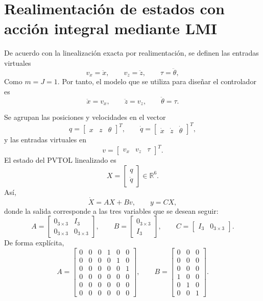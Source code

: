 \clearpage

\section{Realimentación de estados con acción integral mediante LMI}

De acuerdo con la linealización exacta por realimentación, se definen las
entradas virtuales
\[
  v_x=\ddot{x},\qquad v_z=\ddot{z},\qquad \tau=\ddot{\theta},
\]
Como $m=J=1$. Por tanto, el modelo que se
utiliza para diseñar el controlador es
\[
  \ddot{x}=v_x,\qquad
  \ddot{z}=v_z,\qquad
  \ddot{\theta}=\tau.
\]

Se agrupan las posiciones y velocidades en el vector
\[
  q=
  \begin{bmatrix}x&z&\theta\end{bmatrix}^{T},
  \qquad
  \dot q=
  \begin{bmatrix}\dot{x}&\dot{z}&\dot{\theta}\end{bmatrix}^{T},
\]
y las entradas virtuales en
\[
  v=
  \begin{bmatrix}v_x&v_z&\tau\end{bmatrix}^{T}.
\]
El estado del PVTOL linealizado es
\[
  X=
  \begin{bmatrix}q\\\dot q\end{bmatrix}\in\mathbb{R}^{6}.
\]
Así,
\[
  \dot X=AX+Bv,\qquad y=CX,
\]
donde la salida corresponde a las tres variables que se desean seguir:
\[
  A=
  \begin{bmatrix}
    0_{3\times3}&I_3\\
    0_{3\times3}&0_{3\times3}
  \end{bmatrix},
  \qquad
  B=
  \begin{bmatrix}
    0_{3\times3}\\
    I_3
  \end{bmatrix},
  \qquad
  C=
  \begin{bmatrix}I_3&0_{3\times3}\end{bmatrix}.
\]
De forma explícita,
\[
  A=
  \begin{bmatrix}
  0&0&0&1&0&0\\
  0&0&0&0&1&0\\
  0&0&0&0&0&1\\
  0&0&0&0&0&0\\
  0&0&0&0&0&0\\
  0&0&0&0&0&0
  \end{bmatrix},
  \qquad
  B=
  \begin{bmatrix}
  0&0&0\\
  0&0&0\\
  0&0&0\\
  1&0&0\\
  0&1&0\\
  0&0&1
  \end{bmatrix}.
\]

